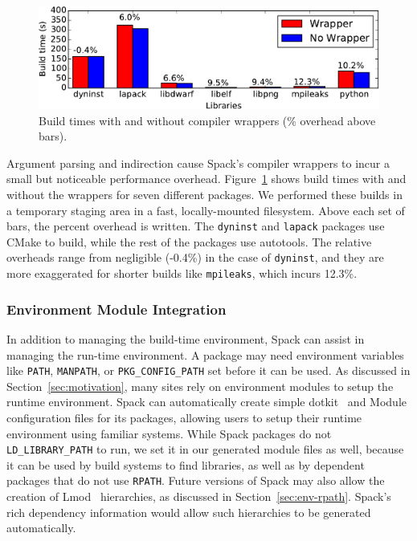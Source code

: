 \begin{figure}
	\centering
	\includegraphics[width=\columnwidth]{figs/wrappers/wrapper-overhead.pdf}
	\caption{
		Build times with and without compiler wrappers\newline
		(\% overhead above bars).
		\label{fig:wrapper-overhead}
	}
\end{figure}

Argument parsing and indirection cause Spack's compiler wrappers to incur a small
but noticeable performance overhead.  Figure~\ref{fig:wrapper-overhead} shows build times
with and without the wrappers for seven different packages. 
We performed these builds in a temporary staging area in a fast, 
locally-mounted filesystem. Above each set of bars,
the percent overhead is written. The {\tt dyninst} and {\tt lapack} packages
use CMake to build, while the rest of the packages use autotools.
The relative overheads range from negligible (-0.4\%) in the case of {\tt dyninst},
and they are more exaggerated for shorter builds like {\tt mpileaks}, which
incurs 12.3\%.  

\subsubsection{Environment Module Integration}
\label{sec:envmodule}
In addition to managing the build-time environment, Spack can assist in managing
the run-time environment.  A package may need environment variables like {\tt PATH},
{\tt MANPATH}, or {\tt PKG\_CONFIG\_PATH} set before it can be used.
As discussed in Section~\ref{sec:motivation}, many sites rely on environment
modules to setup the runtime environment.  Spack can automatically create simple
dotkit~\cite{dotkit} and Module configuration files for its packages, allowing
users to setup their runtime environment using familiar systems.  While Spack
packages do not {\tt LD\_LIBRARY\_PATH} to run, we set it in our generated module
files as well, because it can be used by build systems to find libraries, as well
as by dependent packages that do not use {\tt RPATH}.
%
Future versions of Spack may also allow the creation of Lmod~\cite{mclay:lmod}
hierarchies, as discussed in Section~\ref{sec:env-rpath}. Spack's rich
dependency information would allow such hierarchies to be generated automatically.












